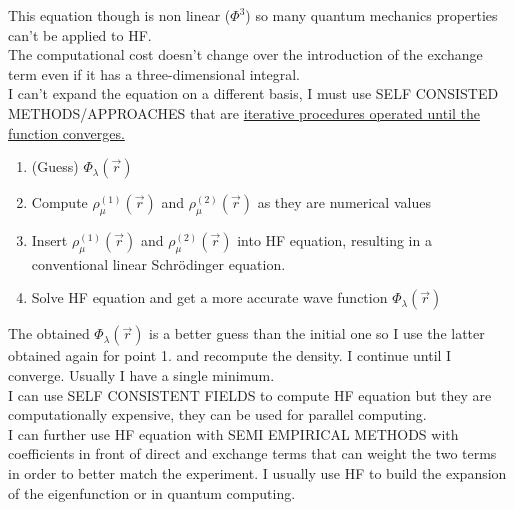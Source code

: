 This equation though is non linear ($\Phi^3$) so many quantum mechanics properties can't be applied to HF.\\
The computational cost doesn't change over the introduction of the exchange term even if it has a three-dimensional integral.\\
I can't expand the equation on a different basis, I must use SELF CONSISTED METHODS/APPROACHES that are \ul{iterative procedures operated until the function converges.}
\begin{enumerate}
	\item (Guess) $\Phi_\lambda (\vec{r})$
	\item Compute $\rho_\mu^{(1)}(\vec{r})$ and $\rho_\mu^{(2)}(\vec{r})$ as they are numerical values
	\item Insert $\rho_\mu^{(1)}(\vec{r})$ and $\rho_\mu^{(2)}(\vec{r})$ into HF equation, resulting in a conventional linear Schr\"odinger equation.
	\item Solve HF equation and get a more accurate wave function $\Phi_\lambda (\vec{r})$
	\end{enumerate}
The obtained $\Phi_\lambda (\vec{r})$ is a better guess than the initial one so I use the latter obtained again for point 1. and recompute the density. I continue until I converge. Usually I have a single minimum. \\
I can use SELF CONSISTENT FIELDS to compute HF equation but they are computationally expensive, they can be used for parallel computing. \\

I can further use HF equation with SEMI EMPIRICAL METHODS with coefficients in front of direct and exchange terms that can weight the two terms in order to better match the experiment. I usually use HF to build the expansion of the eigenfunction or in quantum computing.\\

